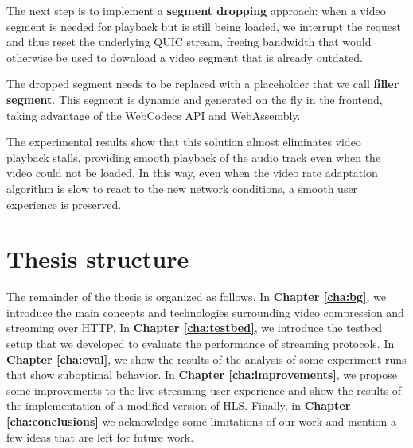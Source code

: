 The next step is to implement a \textbf{segment dropping} approach: when a video segment is needed for playback but is still being loaded, we interrupt the request and thus reset the underlying QUIC stream, freeing bandwidth that would otherwise be used to download a video segment that is already outdated.

The dropped segment needs to be replaced with a placeholder that we call \textbf{filler segment}. This segment is dynamic and generated on the fly in the frontend, taking advantage of the WebCodecs API and WebAssembly.

The experimental results show that this solution almost eliminates video playback stalls, providing smooth playback of the audio track even when the video could not be loaded. In this way, even when the video rate adaptation algorithm is slow to react to the new network conditions, a smooth user experience is preserved.

\section{Thesis structure}
\label{sec:intro/structure}

The remainder of the thesis is organized as follows. In \textbf{Chapter \ref{cha:bg}}, we introduce the main concepts and technologies surrounding video compression and streaming over HTTP. In \textbf{Chapter \ref{cha:testbed}}, we introduce the testbed setup that we developed to evaluate the performance of streaming protocols. In \textbf{Chapter \ref{cha:eval}}, we show the results of the analysis of some experiment runs that show suboptimal behavior. In \textbf{Chapter \ref{cha:improvements}}, we propose some improvements to the live streaming user experience and show the results of the implementation of a modified version of HLS. Finally, in \textbf{Chapter \ref{cha:conclusions}} we acknowledge some limitations of our work and mention a few ideas that are left for future work.


